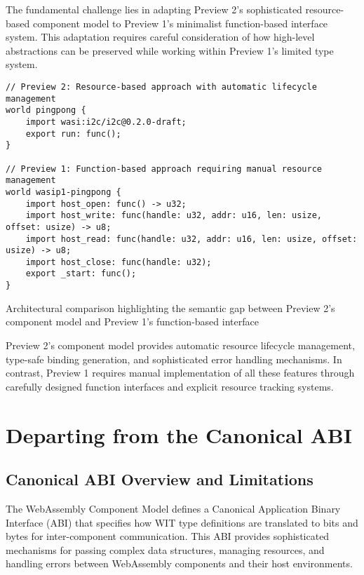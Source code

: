 The fundamental challenge lies in adapting Preview 2's sophisticated resource-based component model to Preview 1's minimalist function-based interface system. This adaptation requires careful consideration of how high-level abstractions can be preserved while working within Preview 1's limited type system.

\begin{listing}[H]
\begin{verbatim}
// Preview 2: Resource-based approach with automatic lifecycle management
world pingpong {
    import wasi:i2c/i2c@0.2.0-draft;
    export run: func();
}

// Preview 1: Function-based approach requiring manual resource management
world wasip1-pingpong {
    import host_open: func() -> u32;
    import host_write: func(handle: u32, addr: u16, len: usize, offset: usize) -> u8;
    import host_read: func(handle: u32, addr: u16, len: usize, offset: usize) -> u8;
    import host_close: func(handle: u32);
    export _start: func();
}
\end{verbatim}
\caption{Architectural comparison highlighting the semantic gap between Preview 2's component model and Preview 1's function-based interface}
\label{lst:preview-comparison}
\end{listing}

Preview 2's component model provides automatic resource lifecycle management, type-safe binding generation, and sophisticated error handling mechanisms. In contrast, Preview 1 requires manual implementation of all these features through carefully designed function interfaces and explicit resource tracking systems.

\section{Departing from the Canonical ABI}
\label{sec:canonical-abi-departure}

\subsection{Canonical ABI Overview and Limitations}

The WebAssembly Component Model defines a Canonical Application Binary Interface (ABI) that specifies how WIT type definitions are translated to bits and bytes for inter-component communication. This ABI provides sophisticated mechanisms for passing complex data structures, managing resources, and handling errors between WebAssembly components and their host environments.

